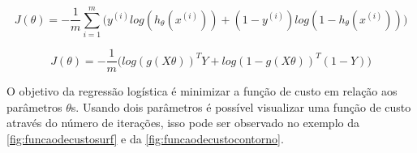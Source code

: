 \begin{equation}
\label{eq:funcaodecustofinal}
J(\theta) = - \frac{1}{m}\sum\limits_{i=1}^{m}\Big( y^{(i)}log(h_{\theta}(x^{(i)})) + (1-y^{(i)})log(1 - h_{\theta}(x^{(i)})) \Big)
\end{equation}

\begin{equation}
J(\theta) = - \frac{1}{m}\Big( log(g(X\theta))^TY + log(1 - g(X\theta))^T(1 - Y) \Big) \label{eq:funcaodecustovet}
\end{equation}

O objetivo da regressão logística é minimizar a função de custo em relação aos parâmetros $\theta$s. Usando dois parâmetros é possível visualizar uma função de custo através do número de iterações, isso pode ser observado no exemplo da \autoref{fig:funcaodecustosurf} e da \autoref{fig:funcaodecustocontorno}. 


